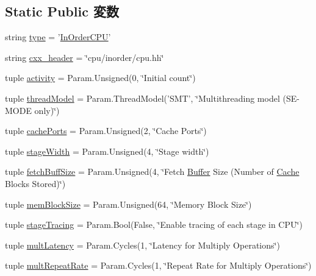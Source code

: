 \subsection*{Static Public 変数}
\begin{DoxyCompactItemize}
\item 
string \hyperlink{classInOrderCPU_1_1InOrderCPU_acce15679d830831b0bbe8ebc2a60b2ca}{type} = '\hyperlink{classInOrderCPU_1_1InOrderCPU}{InOrderCPU}'
\item 
string \hyperlink{classInOrderCPU_1_1InOrderCPU_a17da7064bc5c518791f0c891eff05fda}{cxx\_\-header} = \char`\"{}cpu/inorder/cpu.hh\char`\"{}
\item 
tuple \hyperlink{classInOrderCPU_1_1InOrderCPU_a179708190406cb8098a70bbdfd73088c}{activity} = Param.Unsigned(0, \char`\"{}Initial count\char`\"{})
\item 
tuple \hyperlink{classInOrderCPU_1_1InOrderCPU_ad09c85591c223511ab9f14c56fb8c294}{threadModel} = Param.ThreadModel('SMT', \char`\"{}Multithreading model (SE-\/MODE only)\char`\"{})
\item 
tuple \hyperlink{classInOrderCPU_1_1InOrderCPU_a351bb34b2113c3ae4bd2449d92794d5a}{cachePorts} = Param.Unsigned(2, \char`\"{}Cache Ports\char`\"{})
\item 
tuple \hyperlink{classInOrderCPU_1_1InOrderCPU_aa8845475b9a7edffd6e4af8229af406a}{stageWidth} = Param.Unsigned(4, \char`\"{}Stage width\char`\"{})
\item 
tuple \hyperlink{classInOrderCPU_1_1InOrderCPU_acf6ecee886e4ec3d3d5d5a716ba9769c}{fetchBuffSize} = Param.Unsigned(4, \char`\"{}Fetch \hyperlink{classBuffer}{Buffer} Size (Number of \hyperlink{classCache}{Cache} Blocks Stored)\char`\"{})
\item 
tuple \hyperlink{classInOrderCPU_1_1InOrderCPU_a6032108902ed2f0fd6f442b6e55201e1}{memBlockSize} = Param.Unsigned(64, \char`\"{}Memory Block Size\char`\"{})
\item 
tuple \hyperlink{classInOrderCPU_1_1InOrderCPU_a1f582486a8f1132a6b4d887e1eaa8720}{stageTracing} = Param.Bool(False, \char`\"{}Enable tracing of each stage in CPU\char`\"{})
\item 
tuple \hyperlink{classInOrderCPU_1_1InOrderCPU_afcda6c29d525f6eee0250f9e88ad6f62}{multLatency} = Param.Cycles(1, \char`\"{}Latency for Multiply Operations\char`\"{})
\item 
tuple \hyperlink{classInOrderCPU_1_1InOrderCPU_a9bc688118111286e54b0856ba347ec12}{multRepeatRate} = Param.Cycles(1, \char`\"{}Repeat Rate for Multiply Operations\char`\"{})
\item 

\end{DoxyCompactItemize}
